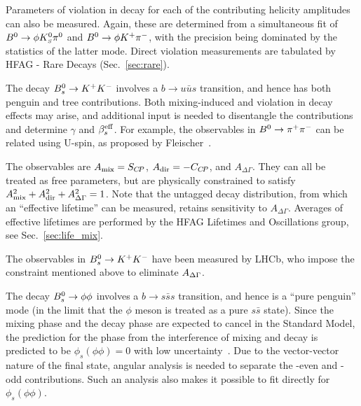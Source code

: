 Parameters of \CP violation in decay for each of the contributing helicity
amplitudes can also be measured. Again, these are determined from a
simultaneous fit of $B^0 \to \phi K^0_{\scriptscriptstyle S} \pi^0$ and $B^0 \to \phi K^+ \pi^-$,
with the precision being dominated by the statistics of the latter mode. 
Direct \CP violation measurements are tabulated by HFAG - Rare Decays (Sec.~\ref{sec:rare}). 

\label{sec:cp_uta:qqs:BstoKK}

The decay $B^0_s \to K^+K^-$ involves a $b \to u\bar{u}s$ transition, and hence has both penguin and tree contributions. Both mixing-induced and \CP violation in decay effects may arise, and additional input is needed to disentangle the contributions and determine $\gamma$ and $\beta_s^{\rm eff}$. For example, the observables in $B^0 \to \pi^+\pi^-$ can be related using U-spin, as proposed by Fleischer~\cite{Fleischer:1999pa}.

The observables are $A_{\rm mix} = S_{C\!P}$, $A_{\rm dir} = -C_{C\!P}$, and $A_{\Delta\Gamma}$. They can all be treated as free parameters, but are physically constrained to satisfy $A_{\rm mix}^2 + A_{\rm dir}^2 + A_{\Delta\Gamma}^2 = 1$. Note that the untagged decay distribution, from which an ``effective lifetime'' can be measured, retains sensitivity to $A_{\Delta\Gamma}$. Averages of effective lifetimes are performed by the HFAG Lifetimes and Oscillations group, see Sec.~\ref{sec:life_mix}.

The observables in $B^0_s \to K^+K^-$ have been measured by LHCb, who impose the constraint mentioned above to eliminate $A_{\rm \Delta\Gamma}$. 



\label{sec:cp_uta:qqs:Bstophiphi}

 The decay $B^0_s \to \phi\phi$ involves a $b \to s\bar{s}s$ transition, and hence is a ``pure penguin'' mode (in the limit that the $\phi$ meson is treated as a pure $s\bar{s}$ state). Since the mixing phase and the decay phase are expected to cancel in the Standard Model, the prediction for the phase from the interference of mixing and decay is predicted to be $\phi_s(\phi\phi) = 0$ with low uncertainty~\cite{Raidal:2002ph}. Due to the vector-vector nature of the final state, angular analysis is needed to separate the \CP-even and \CP-odd contributions. Such an analysis also makes it possible to fit directly for $\phi_s(\phi\phi)$.

